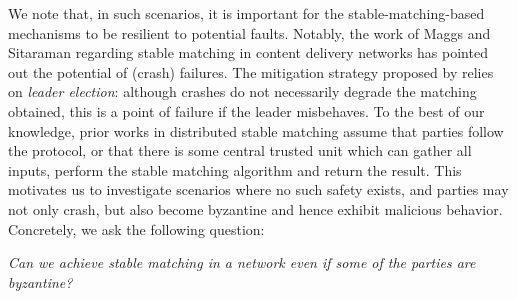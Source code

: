 We note that, in such scenarios, it is important for the stable-matching-based mechanisms to be resilient to potential faults. Notably, the work of Maggs and Sitaraman \cite{MaSi15} regarding stable matching in content delivery networks has pointed out the potential of (crash) failures. The mitigation strategy proposed by \cite{MaSi15} relies on \emph{leader election}: although crashes do not necessarily degrade the matching obtained, this is a point of failure if the leader misbehaves. To the best of our knowledge, prior works in distributed stable matching assume that parties follow the protocol, or that there is some central trusted unit which can gather all inputs, perform the stable matching algorithm and return the result. This motivates us to investigate scenarios where no such safety exists, and parties may not only crash, but also become byzantine and hence exhibit malicious behavior. Concretely, we ask the following question:

\vspace{-0.1cm}
{
\begin{center}
\emph{Can we achieve stable matching in a network even if some of the parties are byzantine?}
\end{center}
}
\vspace{-0.6cm}

